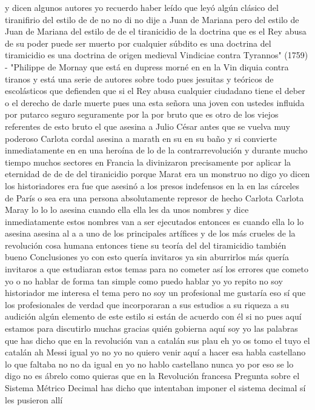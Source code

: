 y dicen algunos autores yo recuerdo haber leído que leyó algún clásico del tiranifirio del estilo de de no no di no dije a Juan de Mariana
pero del estilo de Juan de Mariana del estilo de de el tiranicidio de la doctrina que es el Rey
abusa de su poder puede ser muerto por cualquier súbdito es una doctrina del tiramicidio es una doctrina de origen medieval
Vindiciae contra Tyrannos" (1759) - "Philippe de Mornay
que está en dupress morné en en la Vin diquia contra tiranos y está una serie de autores sobre todo pues jesuitas y teóricos de escolásticos
que defienden que si el Rey abusa cualquier ciudadano tiene el deber o el derecho de darle muerte
pues una esta señora una joven con ustedes influida por putarco seguro seguramente por la por bruto
que es otro de los viejos referentes de esto bruto el que asesina a Julio César antes que se vuelva muy poderoso
Carlota cordal asesina a marath en su en su baño
y si convierte inmediatamente en en una heroína de lo de la contrarrevolución y durante mucho tiempo muchos sectores en Francia la divinizaron
precisamente por aplicar la eternidad de de de del tiranicidio porque Marat era un monstruo
no digo yo dicen los historiadores era fue que asesinó a los presos indefensos en la en las cárceles de París
o sea era una persona absolutamente represor de hecho Carlota Carlota Maray lo lo
lo asesina cuando ella ella les da unos nombres y dice inmediatamente estos nombres van a ser ejecutados entonces es cuando ella lo
lo asesina asesina al a a uno de los principales artífices y de los más crueles de la revolución
cosa humana entonces tiene su teoría del del tiramicidio también bueno
Conclusiones
yo con esto quería invitaros ya sin aburrirlos más quería invitaros a que estudiaran estos temas para no cometer así los errores que cometo yo
o no hablar de forma tan simple como puedo hablar yo yo repito no soy historiador me interesa el tema
pero no soy un profesional me gustaría eso sí que los profesionales de verdad que incorporaran a sus estudios
a su riqueza a su audición algún elemento de este estilo si están de acuerdo con él si no pues aquí estamos para discutirlo muchas gracias
quién gobierna aquí soy yo las palabras
que has dicho que en la revolución van a catalán sus plau eh yo os tomo el tuyo el catalán ah Messi igual yo no
yo no quiero venir aquí a hacer esa habla castellano lo que faltaba no no da igual en
yo no hablo castellano nunca yo por eso se lo digo no es ábrelo como quieras que en la Revolución francesa
Pregunta sobre el Sistema Métrico Decimal
has dicho que intentaban imponer el sistema decimal sí les pusieron allí
